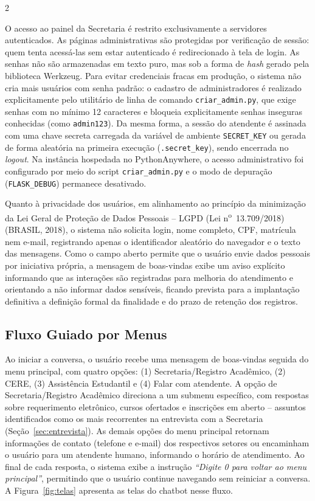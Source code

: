 \documentclass[10pt]{article}
\begin{document}
\begin{multicols}{2}

O acesso ao painel da Secretaria é restrito exclusivamente a servidores
autenticados. As páginas administrativas são protegidas por verificação
de sessão: quem tenta acessá-las sem estar autenticado é redirecionado à
tela de login. As senhas não são armazenadas em texto puro, mas sob a
forma de \textit{hash} gerado pela biblioteca Werkzeug. Para evitar
credenciais fracas em produção, o sistema não cria mais usuários com
senha padrão: o cadastro de administradores é realizado explicitamente
pelo utilitário de linha de comando \texttt{criar\_admin.py}, que exige
senhas com no mínimo 12 caracteres e bloqueia explicitamente senhas
inseguras conhecidas (como \texttt{admin123}). Da mesma forma, a sessão
do atendente é assinada com uma chave secreta carregada da variável de
ambiente \texttt{SECRET\_KEY} ou gerada de forma aleatória na primeira
execução (\texttt{.secret\_key}), sendo encerrada no \textit{logout}. Na
instância hospedada no PythonAnywhere, o acesso administrativo foi
configurado por meio do script \texttt{criar\_admin.py} e o modo de
depuração (\texttt{FLASK\_DEBUG}) permanece desativado.

Quanto à privacidade dos usuários, em alinhamento ao princípio da
minimização da Lei Geral de Proteção de Dados Pessoais -- LGPD
(Lei n\textsuperscript{o}~13.709/2018) (BRASIL, 2018), o sistema não
solicita login, nome completo, CPF, matrícula nem e-mail, registrando
apenas o identificador aleatório do navegador e o texto das mensagens. Como
o campo aberto permite que o usuário envie dados pessoais por iniciativa
própria, a mensagem de boas-vindas exibe um aviso explícito informando
que as interações são registradas para melhoria do atendimento e
orientando a não informar dados sensíveis, ficando prevista para a
implantação definitiva a definição formal da finalidade e do prazo de
retenção dos registros.

\subsection{Fluxo Guiado por Menus}

Ao iniciar a conversa, o usuário recebe uma mensagem de boas-vindas
seguida do menu principal, com quatro opções: (1) Secretaria/Registro
Acadêmico, (2) CERE, (3) Assistência Estudantil e (4) Falar com
atendente. A opção de Secretaria/Registro Acadêmico direciona a um
submenu específico, com respostas sobre requerimento eletrônico, cursos
ofertados e inscrições em aberto -- assuntos identificados como os mais
recorrentes na entrevista com a Secretaria (Seção~\ref{sec:entrevista}). As demais opções do
menu principal retornam informações de contato (telefone e e-mail) dos
respectivos setores ou encaminham o usuário para um atendente humano,
informando o horário de atendimento. Ao final de cada resposta, o
sistema exibe a instrução \textit{``Digite 0 para voltar ao menu
principal''}, permitindo que o usuário continue navegando sem reiniciar a
conversa. A Figura~\ref{fig:telas} apresenta as telas do chatbot nesse fluxo.

\end{multicols}
\end{document}
